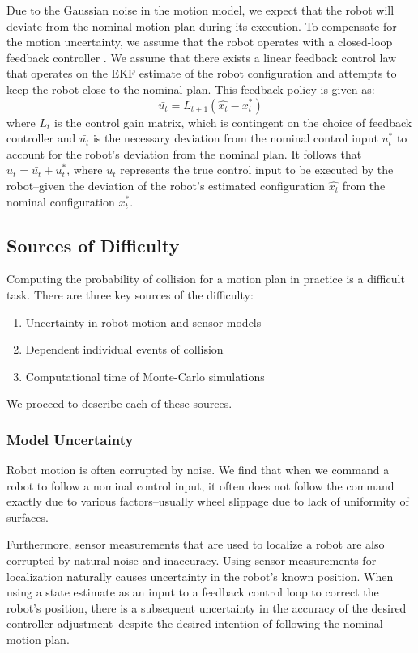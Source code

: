 \documentclass[journal]{IEEEtran}
\begin{document}
Due to the Gaussian noise in the motion model, we expect that the robot will deviate from the nominal motion plan during its execution. To compensate for the motion uncertainty, we assume that the robot operates with a closed-loop feedback controller \cite{IEEEhowto:stengel}. We assume that there exists a linear feedback control law that operates on the EKF estimate of the robot configuration and attempts to keep the robot close to the nominal plan. This feedback policy is given as:%
$$\bar{u_t} = L_{t+1}(\hat{x_t} - x_t^*) $$
where $L_{t}$ is the control gain matrix, which is contingent on the choice of feedback controller \cite{IEEEhowto:stengel} and $\bar{u_t}$ is the necessary deviation from the nominal control input $u_t^*$ to account for the robot's deviation from the nominal plan. It follows that $u_t = \bar{u_t} + u_t^*$, where $u_t$ represents the true control input to be executed by the robot--given the deviation of the robot's estimated configuration $\hat{x_t}$ from the nominal configuration $x_t^*$.

\subsection{Sources of Difficulty}
Computing the probability of collision for a motion plan in practice is a difficult task. There are three key sources of the difficulty:
\begin{enumerate}
\item Uncertainty in robot motion and sensor models
\item Dependent individual events of collision
\item Computational time of Monte-Carlo simulations
\end{enumerate}

We proceed to describe each of these sources.
\subsubsection{Model Uncertainty}
Robot motion is often corrupted by noise. We find that when we command a robot to follow a nominal control input, it often does not follow the command exactly due to various factors--usually wheel slippage due to lack of uniformity of surfaces.

Furthermore, sensor measurements that are used to localize a robot are also corrupted by natural noise and inaccuracy. Using sensor measurements for localization naturally causes uncertainty in the robot's known position. When using a state estimate as an input to a feedback control loop to correct the robot's position, there is a subsequent uncertainty in the accuracy of the desired controller adjustment--despite the desired intention of following the nominal motion plan.
\end{document}
